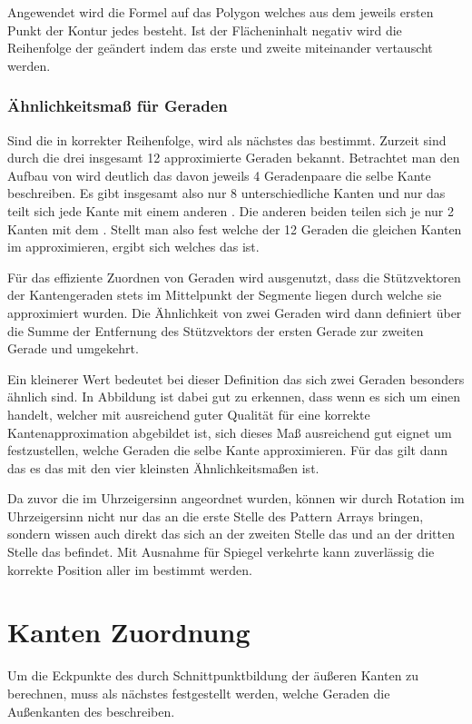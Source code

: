 Angewendet wird die Formel auf das Polygon welches aus dem jeweils ersten Punkt der Kontur jedes \fps besteht. Ist der Flächeninhalt negativ wird die Reihenfolge der \fps geändert indem das erste und zweite \fp miteinander vertauscht werden.
\subsubsection{Ähnlichkeitsmaß für Geraden}
Sind die \fps in korrekter Reihenfolge, wird als nächstes das \olfp bestimmt. Zurzeit sind durch die drei \fps insgesamt 12 approximierte Geraden bekannt. Betrachtet man den Aufbau von \QRCodes wird deutlich das davon jeweils 4 Geradenpaare die selbe Kante beschreiben. Es gibt insgesamt also nur 8 unterschiedliche Kanten und nur das \olfp teilt sich jede Kante mit einem anderen \fp. Die anderen beiden \fps teilen sich je nur 2 Kanten mit dem \olfp. Stellt man also fest welche der 12 Geraden die gleichen Kanten im \QRCode approximieren, ergibt sich welches \fp das \olfp ist.

Für das effiziente Zuordnen von Geraden wird ausgenutzt, dass die Stützvektoren der Kantengeraden stets im Mittelpunkt der Segmente liegen durch welche sie approximiert wurden. Die Ähnlichkeit von zwei Geraden wird dann definiert über die Summe der Entfernung des Stützvektors der ersten Gerade zur zweiten Gerade und umgekehrt.


 Ein kleinerer Wert bedeutet bei dieser Definition das sich zwei Geraden besonders ähnlich sind. In Abbildung  ist dabei gut zu erkennen, dass wenn es sich um einen \QRCode handelt, welcher mit ausreichend guter Qualität für eine korrekte Kantenapproximation abgebildet ist, sich dieses Maß ausreichend gut eignet um festzustellen, welche Geraden die selbe Kante approximieren. Für das \olfp gilt dann das es das \fp mit den vier kleinsten Ähnlichkeitsmaßen ist.

Da zuvor die \fps im Uhrzeigersinn angeordnet wurden, können wir durch Rotation im Uhrzeigersinn nicht nur das \olfp an die erste Stelle des Pattern Arrays bringen, sondern wissen auch direkt das sich an der zweiten Stelle das \orfp und an der dritten Stelle das \ulfp befindet. Mit Ausnahme für Spiegel verkehrte \QRCodes kann zuverlässig die korrekte Position aller \fps im \QRCode bestimmt werden.

\section{Kanten Zuordnung}
Um die Eckpunkte des \QRCodes durch Schnittpunktbildung der äußeren Kanten zu berechnen, muss als nächstes festgestellt werden, welche Geraden die Außenkanten des \QRCodes beschreiben.


